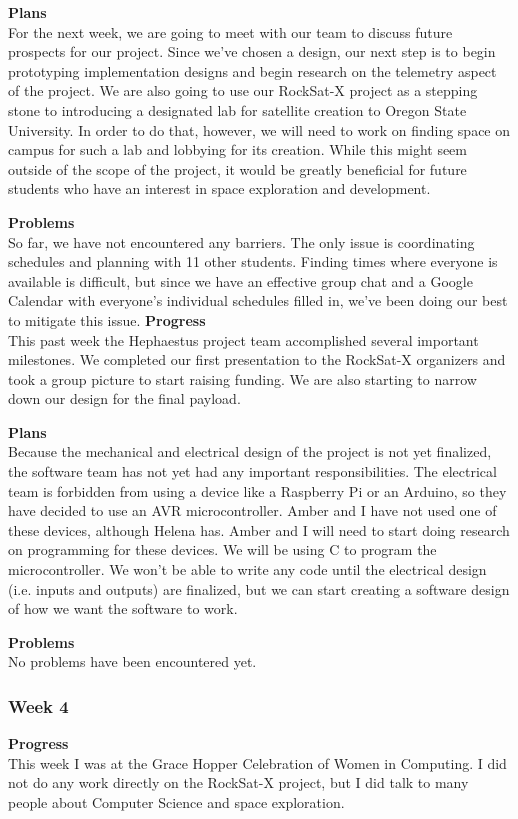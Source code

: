 \textbf{Plans} \\
For the next week, we are going to meet with our team to discuss future prospects for our project. Since we've chosen 
a design, our next step is to begin prototyping implementation designs and begin research on the telemetry aspect of 
the project. We are also going to use our RockSat-X project as a stepping stone to introducing a designated lab for 
satellite creation to Oregon State University. In order to do that, however, we will need to work on finding space on
 campus for such a lab and lobbying for its creation. While this might seem outside of the scope of the project, it 
 would be greatly beneficial for future students who have an interest in space exploration and development.

\textbf{Problems} \\
So far, we have not encountered any barriers. The only issue is coordinating schedules and planning with 11 other 
students. Finding times where everyone is available is difficult, but since we have an effective group chat and a
 Google Calendar with everyone's individual schedules filled in, we've been doing our best to mitigate this issue.
\textbf{Progress} \\
This past week the Hephaestus project team accomplished several important milestones. We completed our first presentation to the RockSat-X organizers and took a group picture to start raising funding. We are also starting to narrow down our design for the final \gls{payload}.

\textbf{Plans} \\
Because the mechanical and electrical design of the project is not yet finalized, the software team has not yet had any important responsibilities. The electrical team is forbidden from using a device like a Raspberry Pi or an Arduino, so they have decided to use an AVR microcontroller. Amber and I have not used one of these devices, although Helena has. Amber and I will need to start doing research on programming for these devices. We will be using C to program the microcontroller. We won't be able to write any code until the electrical design (i.e. inputs and outputs) are finalized, but we can start creating a software design of how we want the software to work.

\textbf{Problems} \\
No problems have been encountered yet.

\subsubsection{Week 4}
\textbf{Progress} \\
This week I was at the Grace Hopper Celebration of Women in Computing. I did not do any work directly on the RockSat-X project, but I did talk to many people about Computer Science and space exploration.

